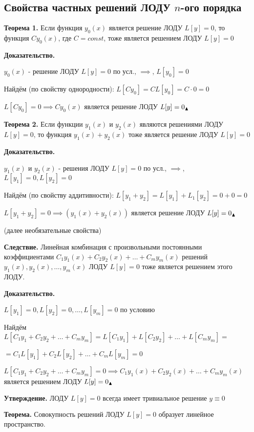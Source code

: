 \documentclass[11pt]{article}
\begin{document}
\subsection*{Свойства частных решений ЛОДУ $n$-ого порядка}
\par\textbf{Теорема 1.} Если функция $y_{0}(x)$ является решение ЛОДУ $L[y] = 0$, то функция $Cy_{0}(x)$, где  $C = const$, тоже является решением ЛОДУ $L[y] = 0$
\par\textbf{Доказательство.}
\par $y_{0}(x)$ - решение ЛОДУ $L[y] = 0$ по усл., $\implies$, $L[y_{0}] = 0$
\par Найдём (по свойству однородности): $L[Cy_{0}] = CL[y_{0}] = C \cdot 0 = 0$
\par $L[Cy_{0}] = 0 \implies Cy_{0}(x)$ является решение ЛОДУ $L[y] = 0 \Large_\blacktriangle$
\par\textbf{Теорема 2.} Если функции $y_{1}(x)$ и $y_{2}(x)$ являются решениями ЛОДУ $L[y] = 0$, то функция $y_{1}(x) + y_{2}(x)$ тоже является решение ЛОДУ $L[y] = 0$
\par\textbf{Доказательство.}
\par $y_{1}(x)$ и $y_{2}(x)$ - решения ЛОДУ $L[y] = 0$ по усл., $\implies$, $L[y_{1}] = 0, L[y_{2}] = 0$
\par Найдём (по свойству аддитивности): $L[y_{1} + y_{2}] = L[y_{1}] + L_{1}[y_{2}] = 0 + 0 = 0$
\par $L[y_{1} + y_{2}] = 0 \implies (y_{1}(x) + y_{2}(x))$ является решение ЛОДУ $L[y] = 0 \Large_\blacktriangle$
\par (далее необязательные свойства)
\par\textbf{Следствие.} Линейная комбинация с произвольными постоянными коэффициентами $C_{1}y_{1}(x) + C_{2}y_{2}(x) + \dots + C_{m}y_{m}(x)$ решений $y_{1}(x), y_{2}(x), \dots, y_{m}(x)$ ЛОДУ $L[y] = 0$ тоже является решением этого ЛОДУ.
\par\textbf{Доказательство.}
\par $L[y_{1}] = 0, L[y_{2}] = 0, \dots, L[y_{m}] = 0$ по условию
\par Найдём $L[C_{1}y_{1} + C_{2}y_{2} + \dots + C_{m}y_{m}] = L[C_{1}y_{1}] + L[C_{2}y_{2}] + \dots + L[C_{m}y_{m}] =$
\par $= C_{1}L[y_{1}] + C_{2}L[y_{2}] + \dots + C_{m}L[y_{m}] = 0$
\par $L[C_{1}y_{1} + C_{2}y_{2} + \dots + C_{m}y_{m}] = 0 \implies C_{1}y_{1}(x) + C_{2}y_{2}(x) + \dots + C_{m}y_{m}(x)$ является решением ЛОДУ $L[y] = 0 \Large_\blacktriangle$
\par\textbf{Утверждение.} ЛОДУ $L[y] = 0$ всегда имеет тривиальное решение $y \equiv 0$
\par\textbf{Теорема.} Совокупность решений ЛОДУ $L[y] = 0$ образует линейное пространство.
\end{document}
